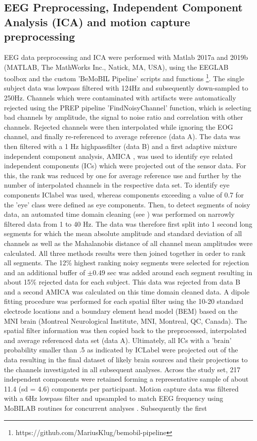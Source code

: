 \subsection{EEG Preprocessing, Independent Component Analysis (ICA) and motion capture preprocessing}
EEG data preprocessing and ICA were performed with Matlab 2017a and 2019b (MATLAB, The MathWorks Inc., Natick, MA, USA), using the EEGLAB toolbox \cite{Delorme2004a} and the custom 'BeMoBIL Pipeline' scripts and functions \footnote{https://github.com/MariusKlug/bemobil-pipeline}. The single subject data was lowpass filtered with 124Hz and subsequently down-sampled to 250Hz. Channels which were contaminated with artifacts were automatically rejected using the PREP pipeline \cite{Bigdely-Shamlo2015} 'FindNoisyChannel' function, which is selecting bad channels by amplitude, the signal to noise ratio and correlation with other channels. Rejected channels were then interpolated while ignoring the EOG channel, and finally re-referenced to average reference (data A). The data was then filtered with a 1 Hz highpassfilter (data B) and a first adaptive mixture independent component analysis, AMICA \cite{Palmer2011}, was used to identify eye related independent components (ICs) which were projected out of the sensor data. For this, the rank was reduced by one for average reference use and further by the number of interpolated channels in the respective data set. To identify eye components IClabel \cite{Pion-Tonachini2019} was used, whereas components exceeding a value of 0.7 for the 'eye' class were defined as eye components. Then, to detect segments of noisy data, an automated time domain cleaning (see \citet{Gramann2018}) was performed on narrowly filtered data from 1 to 40 Hz. The data was therefore first split into 1 second long segments for which the mean absolute amplitude and standard deviation of all channels as well as the Mahalanobis distance of all channel mean amplitudes were calculated. All three methods results were then joined together in order to rank all segments. The 12\% highest ranking noisy segments were selected for rejection and an additional buffer of $\pm 0.49$ sec was added around each segment resulting in about 15\% rejected data for each subject. This data was rejected from data B and a second AMICA was calculated on this time domain cleaned data. A dipole fitting procedure was performed for each spatial filter using the 10-20 standard electrode locations and a boundary element head model (BEM) based on the MNI brain (Montreal Neurological Institute, MNI, Montreal, QC, Canada). The spatial filter information was then copied back to the preprocessed, interpolated and average referenced data set (data A). Ultimately, all ICs with a 'brain' probability smaller than .5 as indicated by ICLabel were projected out of the data resulting in the final dataset of likely brain sources and their projections to the channels investigated in all subsequent analyses. Across the study set, 217 independent components were retained forming a representative sample of about 11.4 (sd = 4.6) components per participant. Motion capture data was filtered with a 6Hz lowpass filter and upsampled to match EEG frequency using MoBILAB routines for concurrent analyses \cite{Ojeda2014}. Subsequently the first 